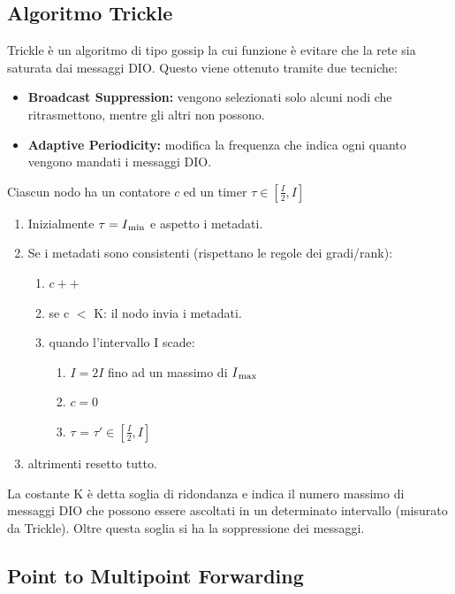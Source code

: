 \documentclass{article}
\begin{document}
\subsection{Algoritmo Trickle}
Trickle è un algoritmo di tipo gossip la cui funzione è evitare che la rete sia saturata dai messaggi DIO. Questo viene ottenuto tramite due tecniche:
\begin{itemize}
    \item \textbf{Broadcast Suppression:} vengono selezionati solo alcuni nodi che ritrasmettono, mentre gli altri non possono.
    \item \textbf{Adaptive Periodicity:} modifica la frequenza che indica ogni quanto vengono mandati i messaggi DIO.
\end{itemize}
Ciascun nodo ha un contatore \(\displaystyle c\) ed un timer \(\displaystyle\tau \in [\frac{I}{2}, I]\)
\begin{enumerate}
    \item Inizialmente \(\displaystyle \tau = I\textsubscript{min}\) e aspetto i metadati.
    \item Se i metadati sono consistenti (rispettano le regole dei gradi/rank):
    \begin{enumerate}
        \item \(\displaystyle c++\)
        \item se c $<$ K: il nodo invia i metadati.
        \item quando l'intervallo I scade:
        \begin{enumerate}
            \item \(\displaystyle I = 2I\) fino ad un massimo di \(\displaystyle I\textsubscript{max}\)
            \item \(\displaystyle c=0\)
            \item \(\displaystyle \tau\) = \(\displaystyle \tau' \in [\frac{I}{2}, I]\)
        \end{enumerate}
    \end{enumerate}
    \item altrimenti resetto tutto.
\end{enumerate}
 La costante K è detta soglia di ridondanza e indica il numero massimo di messaggi DIO che possono essere ascoltati in un determinato intervallo (misurato da Trickle). Oltre questa soglia si ha la soppressione dei messaggi.
 
\subsection{Point to Multipoint Forwarding}
\end{document}
